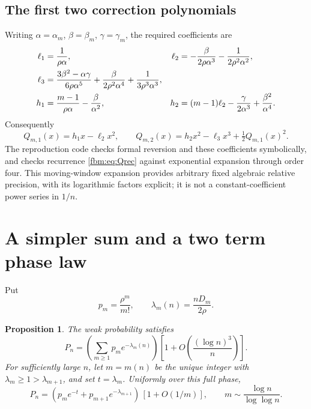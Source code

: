 \documentclass[11pt]{article}
\newtheorem{proposition}[theorem]{Proposition}
\theoremstyle{remark}\newtheorem{remark}[theorem]{Remark}
\begin{document}
\subsection{The first two correction polynomials}
Writing $\alpha=\alpha_m$, $\beta=\beta_m$, $\gamma=\gamma_m$, the required coefficients are
\begin{align}
 \ell_1&=\frac1{\rho\alpha},&
 \ell_2&=-\frac{\beta}{2\rho\alpha^3}-\frac1{2\rho^2\alpha^2},\notag\\
 \ell_3&=\frac{3\beta^2-\alpha\gamma}{6\rho\alpha^5}
       +\frac{\beta}{2\rho^2\alpha^4}+\frac1{3\rho^3\alpha^3},\label{fbm:eq:ellcoeff}\\
 h_1&=\frac{m-1}{\rho\alpha}-\frac{\beta}{\alpha^2},&
 h_2&=(m-1)\ell_2-\frac{\gamma}{2\alpha^3}+\frac{\beta^2}{\alpha^4}.\notag
\end{align}
Consequently
\begin{equation}\label{fbm:eq:Q12}
 Q_{m,1}(x)=h_1x-\ell_2x^2,\qquad
 Q_{m,2}(x)=h_2x^2-\ell_3x^3+\tfrac12Q_{m,1}(x)^2.
\end{equation}
The reproduction code checks formal reversion and these coefficients symbolically, and checks recurrence \eqref{fbm:eq:Qrec} against exponential expansion through order four. This moving-window expansion provides arbitrary fixed algebraic relative precision, with its logarithmic factors explicit; it is not a constant-coefficient power series in $1/n$.

\section{A simpler sum and a two term phase law}\label{fbm:sec:phase}
Put
\[
 p_m=\frac{\rho^m}{m!},\qquad \lambda_m(n)=\frac{nD_m}{2\rho}.
\]
\begin{proposition}\label{fbm:prop:simple}
The weak probability satisfies
\begin{equation}\label{fbm:eq:simple}
 P_n=\left(\sum_{m\geq1}p_me^{-\lambda_m(n)}\right)
       \left[1+O\!\left(\frac{(\log n)^3}{n}\right)\right].
\end{equation}
For sufficiently large $n$, let $m=m(n)$ be the unique integer with
$\lambda_m\geq1>\lambda_{m+1}$, and set $t=\lambda_m$. Uniformly over this full phase,
\begin{equation}\label{fbm:eq:twoterm}
 P_n=(p_me^{-t}+p_{m+1}e^{-\lambda_{m+1}})\,[1+O(1/m)],
 \qquad m\sim\frac{\log n}{\log\log n}.
\end{equation}
\end{proposition}
\end{document}
